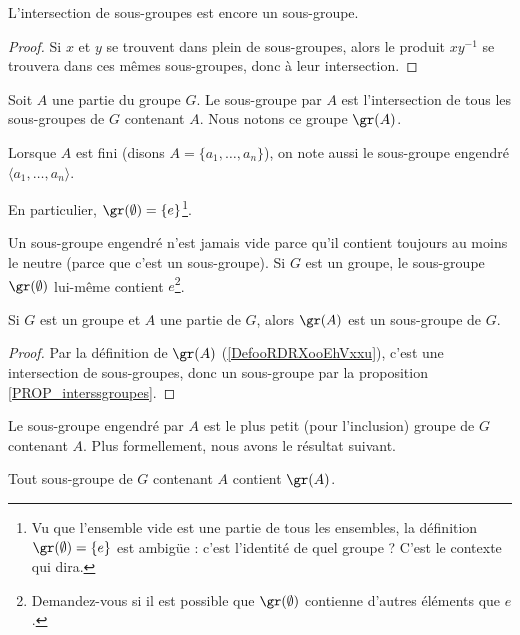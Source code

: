 \begin{proposition}    \label{PROP_interssgroupes}
L'intersection de sous-groupes est encore un sous-groupe.
\end{proposition}
\begin{proof}
Si \( x \) et \( y \) se trouvent dans plein de sous-groupes, alors le produit \( xy^{-1} \) se trouvera dans ces mêmes sous-groupes, donc à leur intersection.
\end{proof}

\begin{definition}        \label{DefooRDRXooEhVxxu}
    Soit \( A\) une partie du groupe \( G\). Le sous-groupe  par \( A\) est l'intersection de tous les sous-groupes de \( G\) contenant \( A\). Nous notons ce groupe \( \gr(A)\).

    Lorsque \( A \) est fini (disons \( A = \{a_1, \dots, a_n\} \)), on note aussi le sous-groupe engendré \( \langle a_1, \dots, a_n \rangle \).

    En particulier, \( \gr(\emptyset)=\{ e \}\)\footnote{Vu que l'ensemble vide est une partie de tous les ensembles, la définition \( \gr(\emptyset)=\{ e \}\) est ambigüe : c'est l'identité de quel groupe ? C'est le contexte qui dira.}.
\end{definition}

Un sous-groupe engendré n'est jamais vide parce qu'il contient toujours au moins le neutre (parce que c'est un sous-groupe). Si \( G\) est un groupe, le sous-groupe \( \gr(\emptyset)\) lui-même contient \( e\)\footnote{Demandez-vous si il est possible que \( \gr(\emptyset)\) contienne d'autres éléments que \( e\).}.

\begin{lemma}
    Si \( G\) est un groupe et \( A\) une partie de \( G\), alors \( \gr(A)\) est un sous-groupe de \( G\).
\end{lemma}
\begin{proof}
   Par la définition de \( \gr(A)\) (\ref{DefooRDRXooEhVxxu}), c'est une intersection de sous-groupes, donc un sous-groupe par la proposition \ref{PROP_interssgroupes}.
\end{proof}

Le sous-groupe engendré par \( A \) est le plus petit (pour l'inclusion) groupe de \( G\) contenant \( A\). Plus formellement, nous avons le résultat suivant.
\begin{lemma}     \label{LEM_contenancedussgrengendre}
    Tout sous-groupe de \( G\) contenant \( A\) contient \( \gr(A)\).
\end{lemma}

